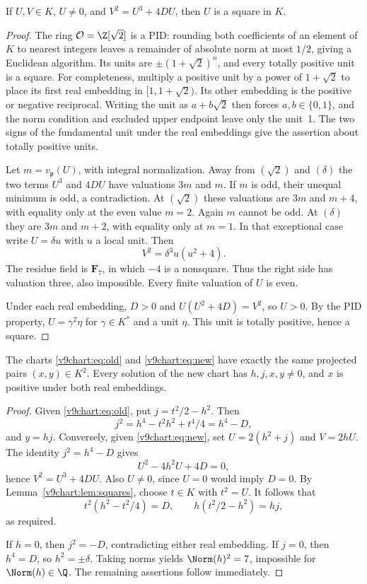 \begin{lemma}\label{v9chart:lem:squares}
If $U,V\in K$, $U\ne0$, and $V^2=U^3+4DU$, then $U$ is a square in $K$.
\end{lemma}
\begin{proof}
The ring $\mathcal O=\Z[\sqrt2]$ is a PID: rounding both coefficients of an element of $K$ to nearest integers leaves a remainder of absolute norm at most $1/2$, giving a Euclidean algorithm. Its units are $\pm(1+\sqrt2)^n$, and every totally positive unit is a square. For completeness, multiply a positive unit by a power of $1+\sqrt2$ to place its first real embedding in $[1,1+\sqrt2)$. Its other embedding is the positive or negative reciprocal. Writing the unit as $a+b\sqrt2$ then forces $a,b\in\{0,1\}$, and the norm condition and excluded upper endpoint leave only the unit~1. The two signs of the fundamental unit under the real embeddings give the assertion about totally positive units.

Let $m=v_{\mathfrak p}(U)$, with integral normalization. Away from $(\sqrt2)$ and $(\delta)$ the two terms $U^3$ and $4DU$ have valuations $3m$ and $m$. If $m$ is odd, their unequal minimum is odd, a contradiction. At $(\sqrt2)$ these valuations are $3m$ and $m+4$, with equality only at the even value $m=2$. Again $m$ cannot be odd. At $(\delta)$ they are $3m$ and $m+2$, with equality only at $m=1$. In that exceptional case write $U=\delta u$ with $u$ a local unit. Then
\[
 V^2=\delta^3u(u^2+4).
\]
The residue field is $\mathbf F_7$, in which $-4$ is a nonsquare. Thus the right side has valuation three, also impossible. Every finite valuation of $U$ is even.

Under each real embedding, $D>0$ and $U(U^2+4D)=V^2$, so $U>0$. By the PID property, $U=\gamma^2\eta$ for $\gamma\in K^*$ and a unit $\eta$. This unit is totally positive, hence a square.
\end{proof}

\begin{proposition}\label{v9chart:prop:chart}
The charts \eqref{v9chart:eq:old} and \eqref{v9chart:eq:new} have exactly the same projected pairs $(x,y)\in K^2$. Every solution of the new chart has $h,j,x,y\ne0$, and $x$ is positive under both real embeddings.
\end{proposition}
\begin{proof}
Given \eqref{v9chart:eq:old}, put $j=t^2/2-h^2$. Then
\[
 j^2=h^4-t^2h^2+t^4/4=h^4-D,
\]
and $y=hj$. Conversely, given \eqref{v9chart:eq:new}, set $U=2(h^2+j)$ and $V=2hU$. The identity $j^2=h^4-D$ gives
\[
 U^2-4h^2U+4D=0,
\]
hence $V^2=U^3+4DU$. Also $U\ne0$, since $U=0$ would imply $D=0$. By Lemma~\ref{v9chart:lem:squares}, choose $t\in K$ with $t^2=U$. It follows that
\[
 t^2(h^2-t^2/4)=D,\qquad h(t^2/2-h^2)=hj,
\]
as required.

If $h=0$, then $j^2=-D$, contradicting either real embedding. If $j=0$, then $h^4=D$, so $h^2=\pm\delta$. Taking norms yields $\Norm(h)^2=7$, impossible for $\Norm(h)\in\Q$. The remaining assertions follow immediately.
\end{proof}

